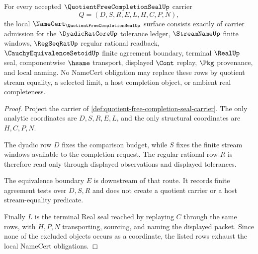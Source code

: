 \begin{theorem}
\label{thm:quotient-free-completion-seal-namecert-obligations}
For every accepted $\QuotientFreeCompletionSealUp$ carrier
$$
Q=(D,S,R,E,L,H,C,P,N),
$$
the local $\NameCert_{\QuotientFreeCompletionSealUp}$ surface consists exactly of carrier admission for the $\DyadicRatCoreUp$ tolerance ledger, $\StreamNameUp$ finite windows, $\RegSeqRatUp$ regular rational readback, $\CauchyEquivalenceSetoidUp$ finite agreement boundary, terminal $\RealUp$ seal, componentwise $\hsame$ transport, displayed $\Cont$ replay, $\Pkg$ provenance, and local naming. No NameCert obligation may replace these rows by quotient stream equality, a selected limit, a host completion object, or ambient real completeness.
\end{theorem}
\begin{proof}
Project the carrier of \autoref{def:quotient-free-completion-seal-carrier}. The only analytic coordinates are $D,S,R,E,L$, and the only structural coordinates are $H,C,P,N$.

The dyadic row $D$ fixes the comparison budget, while $S$ fixes the finite stream windows available to the completion request. The regular rational row $R$ is therefore read only through displayed observations and displayed tolerances.

The equivalence boundary $E$ is downstream of that route. It records finite agreement tests over $D,S,R$ and does not create a quotient carrier or a host stream-equality predicate.

Finally $L$ is the terminal Real seal reached by replaying $C$ through the same rows, with $H,P,N$ transporting, sourcing, and naming the displayed packet. Since none of the excluded objects occurs as a coordinate, the listed rows exhaust the local NameCert obligations.
\end{proof}

